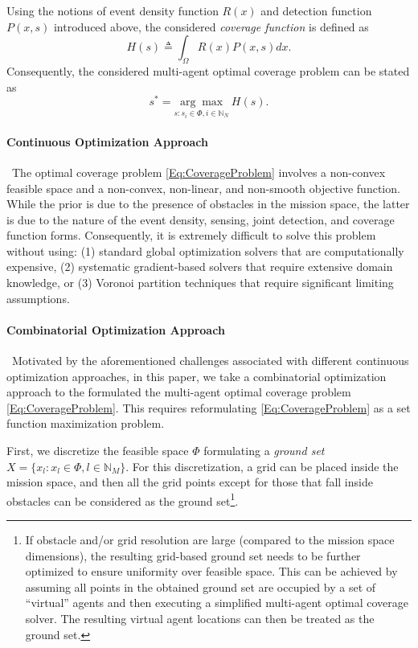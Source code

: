 \documentclass[letterpaper, 10 pt, conference]{ieeeconf}
\newcommand{\N}{\mathbb{N}}
\begin{document}
Using the notions of event density function $R(x)$ and detection function $P(x,s)$ introduced above, the considered \emph{coverage function} is defined as 
\begin{equation}\label{Eq:CoverageObjective}
H(s) \triangleq \int_\Omega R(x)P(x,s)dx.     
\end{equation}
Consequently, the considered multi-agent optimal coverage problem can be stated as
\begin{equation}\label{Eq:CoverageProblem}
 s^* = \underset{s:s_i\in \Phi, i\in \N_N}{\arg\max}\ H(s).  
\end{equation}

\paragraph*{Continuous Optimization Approach}\ 
The optimal coverage problem \eqref{Eq:CoverageProblem} involves a non-convex feasible space and a non-convex, non-linear, and non-smooth objective function. While the prior is due to the presence of obstacles in the mission space, the latter is due to the nature of the event density, sensing, joint detection, and coverage function forms. Consequently, it is extremely difficult to solve this problem without using: (1) standard global optimization solvers that are computationally expensive, (2) systematic gradient-based solvers that require extensive domain knowledge, or (3) Voronoi partition techniques that require significant limiting assumptions.   

\paragraph*{Combinatorial Optimization Approach}\ Motivated by the aforementioned challenges associated with different continuous optimization approaches, in this paper, we take a combinatorial optimization approach to the formulated the multi-agent optimal coverage problem \eqref{Eq:CoverageProblem}. This requires reformulating \eqref{Eq:CoverageProblem} as a set function maximization problem.

First, we discretize the feasible space $\Phi$ formulating a \emph{ground set} $X = \{x_l:x_l\in \Phi, l\in\N_M\}$. For this discretization, a grid can be placed inside the mission space, and then all the grid points except for those that fall inside obstacles can be considered as the ground set\footnote{If obstacle and/or grid resolution are large (compared to the mission space dimensions), the resulting grid-based ground set needs to be further optimized to ensure uniformity over feasible space. This can be achieved by assuming all points in the obtained ground set are occupied by a set of ``virtual'' agents and then executing a simplified multi-agent optimal coverage solver. The resulting virtual agent locations can then be treated as the ground set.}.
\end{document}
